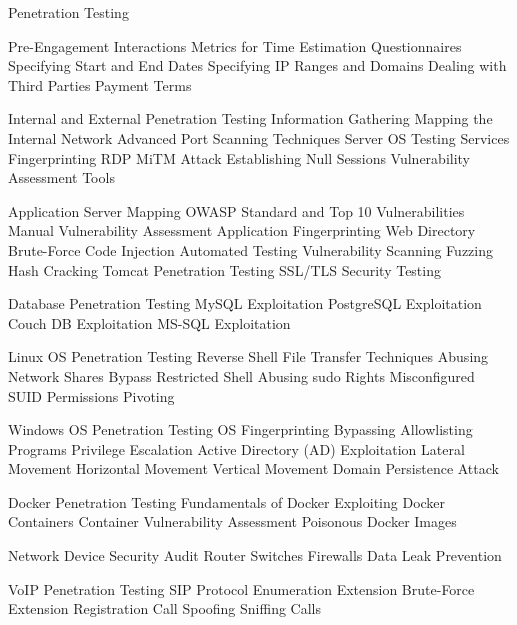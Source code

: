 Penetration Testing

Pre-Engagement Interactions
Metrics for Time Estimation
Questionnaires
Specifying Start and End Dates
Specifying IP Ranges and Domains
Dealing with Third Parties
Payment Terms

Internal and External Penetration Testing
	Information Gathering
	Mapping the Internal Network
	Advanced Port Scanning Techniques
	Server OS Testing
	Services Fingerprinting
	RDP MiTM Attack
	Establishing Null Sessions
	Vulnerability Assessment Tools

Application Server Mapping
	OWASP Standard and Top 10 Vulnerabilities
	Manual Vulnerability Assessment
	Application Fingerprinting
	Web Directory Brute-Force
	Code Injection
	Automated Testing
	Vulnerability Scanning
	Fuzzing
	Hash Cracking
	Tomcat Penetration Testing
	SSL/TLS Security Testing

Database Penetration Testing
	MySQL Exploitation
	PostgreSQL Exploitation
	Couch DB Exploitation
	MS-SQL Exploitation

Linux OS Penetration Testing
	Reverse Shell
	File Transfer Techniques
	Abusing Network Shares
	Bypass Restricted Shell
	Abusing sudo Rights
	Misconfigured SUID Permissions
	Pivoting

Windows OS Penetration Testing
	OS Fingerprinting
	Bypassing Allowlisting Programs
	Privilege Escalation
	Active Directory (AD) Exploitation
	Lateral Movement
		Horizontal Movement
		Vertical Movement
	Domain Persistence Attack

Docker Penetration Testing
	Fundamentals of Docker
	Exploiting Docker Containers
	Container Vulnerability Assessment
	Poisonous Docker Images

Network Device Security Audit
	Router
	Switches
	Firewalls
	Data Leak Prevention

VoIP Penetration Testing
	SIP Protocol Enumeration
	Extension Brute-Force
	Extension Registration
	Call Spoofing
	Sniffing Calls
	
	
	